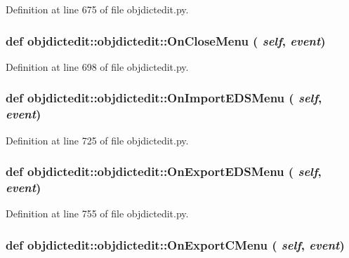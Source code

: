Definition at line 675 of file objdictedit.py.\hypertarget{classobjdictedit_1_1objdictedit_a4c7476aa37450fef74c824201044c3b}{
\subsubsection[OnCloseMenu]{\setlength{\rightskip}{0pt plus 5cm}def objdictedit::objdictedit::On\-Close\-Menu ( {\em self},  {\em event})}}
\label{classobjdictedit_1_1objdictedit_a4c7476aa37450fef74c824201044c3b}




Definition at line 698 of file objdictedit.py.\hypertarget{classobjdictedit_1_1objdictedit_8382d1464dd6a162f97040adc166251e}{
\subsubsection[OnImportEDSMenu]{\setlength{\rightskip}{0pt plus 5cm}def objdictedit::objdictedit::On\-Import\-EDSMenu ( {\em self},  {\em event})}}
\label{classobjdictedit_1_1objdictedit_8382d1464dd6a162f97040adc166251e}




Definition at line 725 of file objdictedit.py.\hypertarget{classobjdictedit_1_1objdictedit_29636fcd3f8f738404b6b99f93f04490}{
\subsubsection[OnExportEDSMenu]{\setlength{\rightskip}{0pt plus 5cm}def objdictedit::objdictedit::On\-Export\-EDSMenu ( {\em self},  {\em event})}}
\label{classobjdictedit_1_1objdictedit_29636fcd3f8f738404b6b99f93f04490}




Definition at line 755 of file objdictedit.py.\hypertarget{classobjdictedit_1_1objdictedit_bf3d84bab96fcc04254a602c33fbbbee}{
\subsubsection[OnExportCMenu]{\setlength{\rightskip}{0pt plus 5cm}def objdictedit::objdictedit::On\-Export\-CMenu ( {\em self},  {\em event})}}
\label{classobjdictedit_1_1objdictedit_bf3d84bab96fcc04254a602c33fbbbee}




